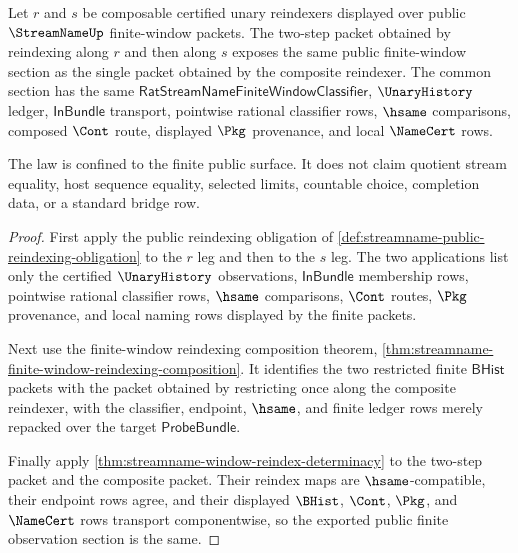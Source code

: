 \begin{theorem}
\label{thm:streamname-public-reindexing-associative-law}
Let $r$ and $s$ be composable certified unary reindexers displayed over public
$\StreamNameUp$ finite-window packets. The two-step packet obtained by
reindexing along $r$ and then along $s$ exposes the same public finite-window
section as the single packet obtained by the composite reindexer. The common
section has the same $\mathsf{RatStreamNameFiniteWindowClassifier}$,
$\UnaryHistory$ ledger, $\mathsf{InBundle}$ transport, pointwise rational
classifier rows, $\hsame$ comparisons, composed $\Cont$ route, displayed
$\Pkg$ provenance, and local $\NameCert$ rows.

The law is confined to the finite public surface. It does not claim quotient
stream equality, host sequence equality, selected limits, countable choice,
completion data, or a standard bridge row.
\end{theorem}
\begin{proof}
First apply the public reindexing obligation of
\autoref{def:streamname-public-reindexing-obligation} to the $r$ leg and then
to the $s$ leg. The two applications list only the certified
$\UnaryHistory$ observations, $\mathsf{InBundle}$ membership rows, pointwise
rational classifier rows, $\hsame$ comparisons, $\Cont$ routes, $\Pkg$
provenance, and local naming rows displayed by the finite packets.

Next use the finite-window reindexing composition theorem,
\autoref{thm:streamname-finite-window-reindexing-composition}. It identifies
the two restricted finite $\mathsf{BHist}$ packets with the packet obtained by
restricting once along the composite reindexer, with the classifier, endpoint,
$\hsame$, and finite ledger rows merely repacked over the target
$\mathsf{ProbeBundle}$.

Finally apply \autoref{thm:streamname-window-reindex-determinacy} to the
two-step packet and the composite packet. Their reindex maps are
$\hsame$-compatible, their endpoint rows agree, and their displayed
$\BHist$, $\Cont$, $\Pkg$, and $\NameCert$ rows transport componentwise, so the
exported public finite observation section is the same.
\end{proof}

